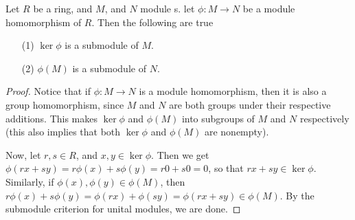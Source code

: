 \begin{lemma}\label{4.2.1}
    Let $R$ be a ring, and  $M$, and $N$ module s. let $\phi:M \xrightarrow{} N$
    be a module homomorphism of $R$. Then the following are true
    \begin{enumerate}
        \item[(1)] $\ker{\phi}$ is a submodule of $M$.

        \item[(2)] $\phi(M)$ is a submodule of $N$.
    \end{enumerate}
\end{lemma}
\begin{proof}
    Notice that if $\phi:M \xrightarrow{} N$ is a module homomorphism, then it
    is also a group homomorphism, since $M$ and $N$ are both groups under their
    respective additions. This makes $\ker{\phi}$ and $\phi(M)$ into subgroups
    of $M$ and  $N$ respectively (this also implies that both $\ker{\phi}$ and
    $\phi(M)$ are nonempty).

    Now, let $r,s \in R$, and  $x,y \in \ker{\phi}$. Then we get
    $\phi(rx+sy)=r\phi(x)+s\phi(y)=r0+s0=0$, so that $rx+sy \in \ker{\phi}$.
    Similarly, if $\phi(x), \phi(y) \in \phi(M)$, then
    $r\phi(x)+s\phi(y)=\phi(rx)+\phi(sy)=\phi(rx+sy) \in \phi(M)$. By the
    submodule criterion for unital modules, we are done.
\end{proof}


